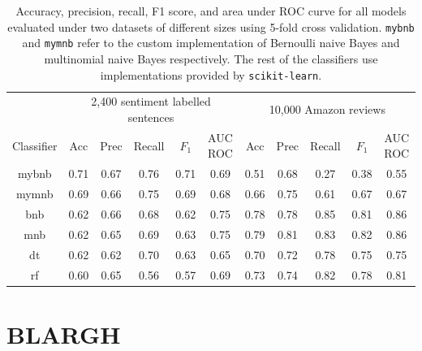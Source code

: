 \documentclass{article} %
\begin{document}
\begin{table}[htbp]
\small
   \centering
   \begin{tabular}{|c|c|c|c|c|c|c|c|c|c|c|}
   \hline
    &  \multicolumn{5}{c|}{2,400 sentiment labelled sentences} &
  \multicolumn{5}{c|}{10,000 Amazon reviews}  \\
  \cline{2-11}
   Classifier & Acc & Prec & Recall & $F_1$ & AUC ROC & Acc & Prec & Recall & $F_1$ & AUC ROC \\ \hline \hline
   mybnb & 0.71 & 0.67 & 0.76 & 0.71 & 0.69 & 0.51 & 0.68 & 0.27 & 0.38 & 0.55 \\\hline
   mymnb & 0.69 & 0.66 & 0.75 & 0.69 & 0.68 & 0.66 & 0.75 & 0.61 & 0.67 & 0.67 \\\hline
   bnb & 0.62 & 0.66 & 0.68 & 0.62 & 0.75 & 0.78 & 0.78 & 0.85 & 0.81 & 0.86 \\\hline
   mnb & 0.62 & 0.65 & 0.69 & 0.63 & 0.75 & 0.79 & 0.81 & 0.83 & 0.82 & 0.86 \\\hline
   dt & 0.62 & 0.62 & 0.70 & 0.63 & 0.65 & 0.70 & 0.72 & 0.78 & 0.75 & 0.75 \\\hline
   rf & 0.60 & 0.65 & 0.56 & 0.57 & 0.69 & 0.73 & 0.74 & 0.82 & 0.78 & 0.81 \\\hline
   \end{tabular}
   \caption{Accuracy, precision, recall, F1 score, and area under ROC curve for all models evaluated under two datasets of different sizes using 5-fold cross validation. \texttt{mybnb} and \texttt{mymnb} refer to the custom implementation of Bernoulli naive Bayes and multinomial naive Bayes respectively. The rest of the classifiers use implementations provided by \texttt{scikit-learn}.}
   \label{tab:classifiers}
\end{table}



\section{BLARGH}
\end{document}
